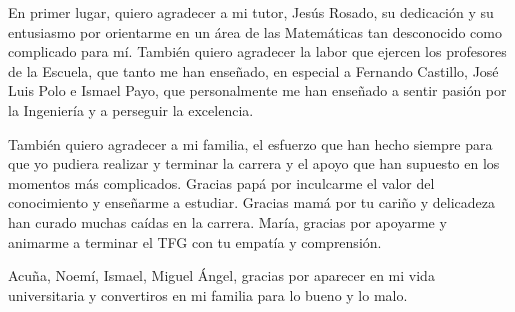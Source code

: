 \begin{agradecimientos}
En primer lugar, quiero agradecer a mi tutor, Jesús Rosado, su dedicación y su entusiasmo por orientarme en un área de las Matemáticas tan desconocido como complicado para mí. También quiero agradecer la labor que ejercen los profesores de la Escuela, que tanto me han enseñado, en especial a Fernando Castillo, José Luis Polo e Ismael Payo, que personalmente me han enseñado a sentir pasión por la Ingeniería y a perseguir la excelencia.

También quiero agradecer a mi familia, el esfuerzo que han hecho siempre para que yo pudiera realizar y terminar la carrera y el apoyo que han supuesto en los momentos más complicados. Gracias papá por inculcarme el valor del conocimiento y enseñarme a estudiar. Gracias mamá por tu cariño y delicadeza han curado muchas caídas en la carrera. María, gracias por apoyarme y animarme a terminar el TFG con tu empatía y comprensión.

Acuña, Noemí, Ismael, Miguel Ángel, gracias por aparecer en mi vida universitaria y convertiros en mi familia para lo bueno y lo malo.
\end{agradecimientos}